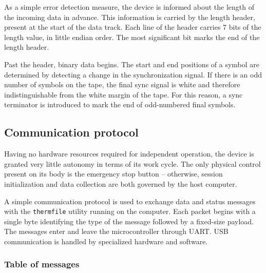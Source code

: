 \documentclass{article}
\begin{document}
	As a simple error detection measure, the device is informed about the
	length of the incoming data in advance. This information is carried by the
	length header, present at the start of the data track. Each line of the
	header carries 7 bits of the length value, in little endian order. The
	most significant bit marks the end of the length header.
	
	Past the header, binary data begins. The start and end positions of a
	symbol are determined by detecting a change in the synchronization signal.
	If there is an odd number of symbols on the tape, the final sync signal is
	white and therefore indistinguishable from the white margin of the tape.
	For this reason, a sync terminator is introduced to mark the end of
	odd-numbered final symbols.
	
	\subsection{Communication protocol}
	
	Having no hardware resources required for independent operation, the device
	is granted very little autonomy in terms of its work cycle. The only
	physical control present on its body is the emergency stop button --
	otherwise, session initialization and data collection are both governed by
	the host computer.
	
	A simple communication protocol is used to exchange data and status
	messages with the \texttt{thermfile} utility running on the computer. Each
	packet begins with a single byte identifying the type of the message
	followed by a fixed-size payload. The messages enter and leave the
	microcontroller through UART. USB communication is handled by specialized
	hardware and software.
	
	\newpage
	\subsubsection{Table of messages}
	\label{sec:messages}
	
\end{document}
